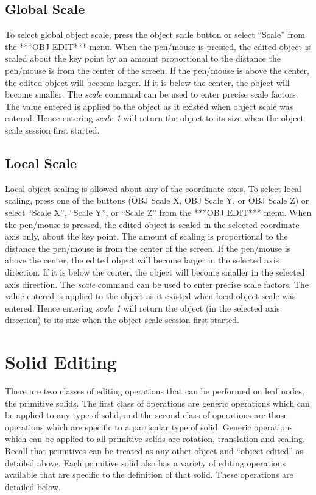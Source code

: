 \subsection{Global Scale}

To select global object scale, press the object scale button or select
``Scale'' from the ***OBJ EDIT*** menu.
When the pen/mouse is pressed, the edited object is scaled about the key
point by an amount
proportional to the distance the pen/mouse is from the center of the screen.
If the pen/mouse is above the center, the edited object will become larger.
If it is below the center, the object will become smaller.
The {\em scale} command can be used to enter precise scale factors.
The value entered is applied to the object as it existed when object
scale was entered.
Hence entering {\em scale 1} will return the object to its size when the
object scale session first started.

\subsection{Local Scale}

Local object scaling is allowed about any of the coordinate axes.
To select local scaling, press one of the buttons (OBJ Scale X, OBJ Scale Y,
or OBJ Scale Z) or select ``Scale X'', ``Scale Y'', or ``Scale Z'' from
the ***OBJ EDIT*** menu.
When the pen/mouse is pressed, the edited object is scaled in the selected
coordinate axis only, about the key point.
The amount of scaling is proportional to the distance the pen/mouse is
from the center of the screen.
If the pen/mouse is above the center, the edited object will become larger
in the selected axis direction.
If it is below the center, the object will become smaller in the selected
axis direction.
The {\em scale} command can be used to enter precise scale factors.
The value entered is applied to the object as it existed when local object
scale was entered.
Hence entering {\em scale 1} will return the object (in the selected axis
direction) to its size when the object scale session first started.

\section{Solid Editing}

There are two classes of editing operations that can be performed on
leaf nodes, the primitive solids.
The first class of operations are generic operations which can be applied to
any type of solid, and the second class of operations are those operations
which are specific to a particular type of solid.
Generic operations which can be applied to all primitive solids are
rotation, translation and scaling.
Recall that primitives can be treated as any other object and ``object
edited'' as detailed above.
Each primitive solid also has a variety of editing operations available that
are specific to the definition of that solid.  These operations are
detailed below.

